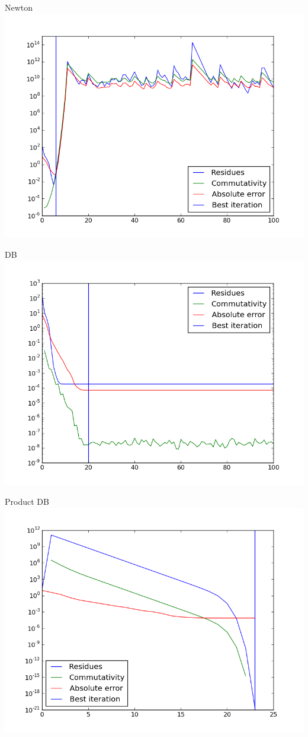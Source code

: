\documentclass{beamer}
\theoremstyle{plain}
\theoremstyle{definition}
\theoremstyle{remark}
\begin{document}
\begin{frame}{Newton}
  \includegraphics[width=\textwidth,height=\textheight]{"chebvand/Newton - absplot"}
\end{frame}
\begin{frame}{DB}
  \includegraphics[width=\textwidth,height=\textheight]{"chebvand/DB - absplot"}
\end{frame}
\begin{frame}{Product DB}
  \includegraphics[width=\textwidth,height=\textheight]{"chebvand/Product DB - absplot"}
\end{frame}
\end{document}
